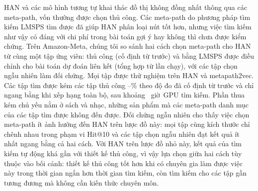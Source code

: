 HAN và các mô hình tương tự khai thác đồ thị không đồng nhất thông qua các meta-path, vốn thường
được chọn thủ công. Các meta-path do phương pháp tìm kiếm LMSPS tìm được đã giúp HAN phân loại nút
tốt hơn, nhưng việc tìm kiếm như vậy có đáng với chi phí trong bài toán gợi ý hay không thì chưa
được kiểm chứng. Trên Amazon-Meta, chúng tôi so sánh hai cách chọn meta-path cho HAN từ cùng một tập
 ứng viên: thủ công (cố định từ trước) và bằng LMSPS được điều chỉnh cho bài toán
dự đoán liên kết (tổng hợp từ  lần chạy), với các tập chọn ngẫu nhiên làm đối
chứng. Mọi tập được thử nghiệm trên HAN và metapath2vec. Các tập tìm được kém các tập thủ công
--\% theo độ đo đã cố định từ trước và chỉ ngang bằng
khi xếp hạng toàn bộ, sau khoảng ~giờ~GPU tìm kiếm. Phần thua kém chủ yếu nằm
ở sách và nhạc, những sản phẩm mà các meta-path danh mục của các tập tìm được không đến được. Đối
chứng ngẫu nhiên cho thấy việc chọn meta-path ít ảnh hưởng đến HAN trên lược đồ này: mọi tập cùng
kích thước chỉ chênh nhau trong phạm vi  Hit@10 và các tập chọn ngẫu nhiên đạt kết
quả ít nhất ngang bằng cả hai cách. Với HAN trên lược đồ nhỏ này, kết quả của tìm kiếm tự động khá
gần với thiết kế thủ công, vì vậy lựa chọn giữa hai cách tùy thuộc vào bối cảnh: thiết kế thủ công
tốt hơn khi có chuyên gia làm được việc này trong thời gian ngắn hơn thời gian tìm kiếm, còn tìm
kiếm cho các tập gần tương đương mà không cần kiến thức chuyên môn.
